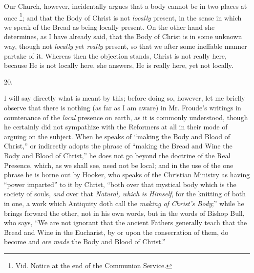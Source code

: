 Our Church, however, incidentally argues that a
body cannot be in two places at once \footnote{Vid. Notice at the end of the Communion Service.}; and that the Body of Christ is not \emph{locally} present, in
the sense in which we speak of the Bread as being locally
present. On the other hand she determines, as I have already said,
that the Body of Christ is in some unknown way, though not \emph{locally}
yet \emph{really} present, so that we after some ineffable manner
partake of it. Whereas then the objection stands, Christ is not really
here, because He is not locally here, she answers, He is really here,
yet not locally.

20.

I will say directly what is meant by this; before
doing so, however, let me briefly observe that there is nothing (as
far as I am aware) in Mr. Froude's writings in countenance of the \emph{local}
presence on earth, as it is commonly understood, though he certainly
did not sympathize with the Reformers at all in their mode of arguing
on the subject. When he speaks of ``making the Body and Blood of
Christ,'' or indirectly adopts the phrase of ``making the Bread and Wine
the Body and Blood of Christ,'' he does not go beyond the doctrine of
the Real Presence, which, as we shall see, need not be local; and in
the use of the one phrase he is borne out by Hooker, who speaks of the
Christian Ministry as having ``power imparted'' to it by Christ, ``both
over that mystical body which is the society of souls, \emph{and} over
that \emph{Natural, which is Himself}, for the knitting of both in
one, a work which Antiquity doth call the \emph{making of Christ's Body};''
while he brings forward the other, not in his own words, but in the
words of Bishop Bull, who says, ``We are not ignorant that the ancient
Fathers generally teach that the Bread and Wine in the Eucharist, by
or upon the consecration of them, do become and \emph{are made} the
Body and Blood of Christ.''

